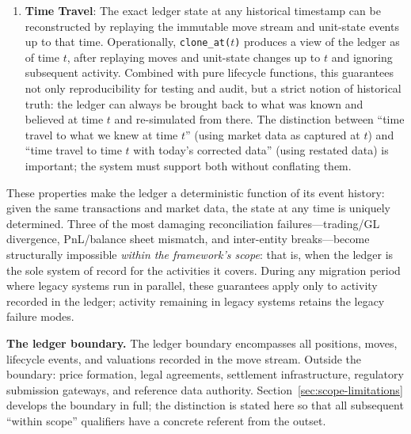 \documentclass[11pt,a4paper]{article}
\begin{document}
\begin{enumerate}
\textit{Qualification.} For lifecycle events involving optionality---exercise, expiry, barrier knock-in/out, callable bond redemption---the invariance applies only to intrinsic value. Time value and embedded option value (the component of a market price reflecting probabilistic future outcomes) are extinguished when optionality resolves. For example: when an option is exercised, time value is destroyed; when a callable bond is called, the bondholder's embedded put-equivalent (the above-market coupon stream) is extinguished. This extinguishment is not a conservation violation: such value components reflect probabilistic expectations that cease to exist when uncertainty resolves. The conservation law governs \emph{quantities}, not market values; value invariance holds exactly for deterministic events and holds for intrinsic value at option-exercise events.
\item \textbf{Time Travel}: The exact ledger state at any historical timestamp can be reconstructed by replaying the immutable move stream and unit-state events up to that time. Operationally, \texttt{clone\_at($t$)} produces a view of the ledger as of time $t$, after replaying moves and unit-state changes up to $t$ and ignoring subsequent activity. Combined with pure lifecycle functions, this guarantees not only reproducibility for testing and audit, but a strict notion of historical truth: the ledger can always be brought back to what was known and believed at time $t$ and re-simulated from there. The distinction between ``time travel to what we knew at time $t$'' (using market data as captured at $t$) and ``time travel to time $t$ with today's corrected data'' (using restated data) is important; the system must support both without conflating them.
\end{enumerate}

These properties make the ledger a deterministic function of its event history: given the same transactions and market data, the state at any time is uniquely determined. Three of the most damaging reconciliation failures---trading/GL divergence, PnL/balance sheet mismatch, and inter-entity breaks---become structurally impossible \emph{within the framework's scope}: that is, when the ledger is the sole system of record for the activities it covers. During any migration period where legacy systems run in parallel, these guarantees apply only to activity recorded in the ledger; activity remaining in legacy systems retains the legacy failure modes.

\medskip
\noindent\textbf{The ledger boundary.} The ledger boundary encompasses all positions, moves, lifecycle events, and valuations recorded in the move stream. Outside the boundary: price formation, legal agreements, settlement infrastructure, regulatory submission gateways, and reference data authority. Section~\ref{sec:scope-limitations} develops the boundary in full; the distinction is stated here so that all subsequent ``within scope'' qualifiers have a concrete referent from the outset.
\end{document}
